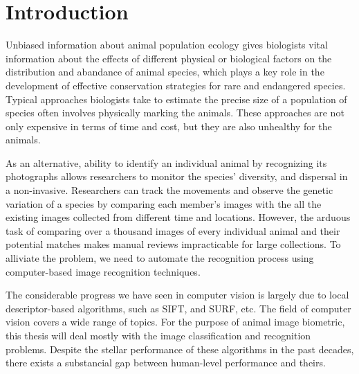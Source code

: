 
\chapter{Introduction}



Unbiased information about animal population ecology gives biologists vital information about the effects of different physical or biological factors on the distribution and abandance of animal species, which plays a key role in the development of effective conservation strategies for rare and endangered species. Typical approaches biologists take to estimate the precise size of a population of species often involves physically marking the animals. These approaches are not only expensive in terms of time and cost, but they are also unhealthy for the animals.

As an alternative, ability to identify an individual animal by recognizing its photographs allows researchers to monitor the species' diversity, and dispersal in a non-invasive. Researchers can track the movements and observe the genetic variation of a species by comparing each member's images with the all the existing images collected from different time and locations. However, the arduous task of comparing over a thousand images of every individual animal and their potential matches makes manual reviews impracticable for large collections. To alliviate the problem, we need to automate the recognition process using computer-based image recognition techniques.

The considerable progress we have seen in computer vision is largely due to local descriptor-based algorithms, such as SIFT\cite{lowe04}, and SURF\cite{surf08}, etc. The field of computer vision covers a wide range of topics. For the purpose of animal image biometric, this thesis will deal mostly with the image classification and recognition problems. Despite the stellar performance of these algorithms in the past decades, there exists a substancial gap between human-level performance and theirs.

